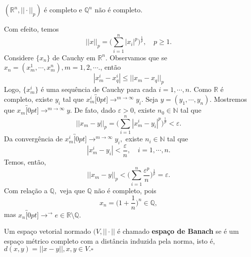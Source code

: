 \documentclass[MetricSpaces/metric_notes.tex]{subfiles}
\begin{document}
\begin{example}
	\((\mathbb{R}^{n}, ||\cdot||_{p})\) é completo e \(\mathbb{Q}^{n}\) não é completo.

	Com efeito, temos
	\[
		||x||_{p} = \biggl(\sum\limits_{i=1}^{n}|x_{i}|^{p}\biggr)^{\frac{1}{p}},\quad p\geq 1.
	\]
	Considere \(\{x_{n}\}\) de Cauchy em \(\mathbb{R}^{n}\). Observamos que se \(x_{n} = (x_{m}^{1}, \cdots, x_{m}^{n}), m = 1, 2, \cdots.\), então
	\[
		|x_{m}^{i}-x_{q}^{i}|\leq ||x_{m}-x_{q}||_{p}
	\]
	Logo, \(\{x_{m}^{i}\}\) é uma sequência de Cauchy para cada \(i=1, \cdots, n.\) Como \(\mathbb{R}\) é completo,
	existe \(y_{i}\) tal que \(x_{m}^{i}\overbracket[0pt]{\longrightarrow}^{m\to \infty}y_{i}.\) Seja \(y= (y_{1}, \cdots, y_{n}).\)
	Mostremos que \(x_{m}\overbracket[0pt]{\longrightarrow}^{m\to \infty}y.\) De fato, dado \(\varepsilon >0\), existe \(n_{0}\in \mathbb{N}\)
	tal que
	\[
		||x_{m}-y||_{p} = \biggl(\sum\limits_{i=1}^{n}|x_{m}^{i}-y_{i}|^{p}\biggr)^{\frac{1}{p}} < \varepsilon.
	\]
	Da convergência de \(x_{m}^{i}\overbracket[0pt]{\longrightarrow}^{m\to \infty}y_{i},\) existe \(n_{i}\in \mathbb{N}\) tal que
	\[
		|x_{m}^{i}-y_{i}| < \frac{\varepsilon}{n},\quad i=1,\cdots,n.
	\]
	Temos, então,
	\[
		||x_{m}-y||_{p} < \biggl(\sum\limits_{i=1}^{n}\frac{\varepsilon^{p}}{n}\biggr)^{\frac{1}{p}} = \varepsilon.
	\]
	Com relação a \(\mathbb{Q},\) veja que \(\mathbb{Q}\) não é completo, pois
	\[
		x_{n} = \biggl(1 + \frac{1}{n}\biggr)^{n}\in \mathbb{Q},
	\]
	mas \(x_{n}\overbracket[0pt]{\longrightarrow}^{\to }e\in \mathbb{R}\setminus{\mathbb{Q}}.\)

\end{example}
\begin{def*}
	Um espaço vetorial normado \((V, ||\cdot ||\) é chamado \textbf{espaço de Banach} se é um espaço métrico completo com a distância induzida pela norma, isto é,
	\(d(x, y) = ||x-y||, x, y\in V.\square\)
\end{def*}
\end{document}
